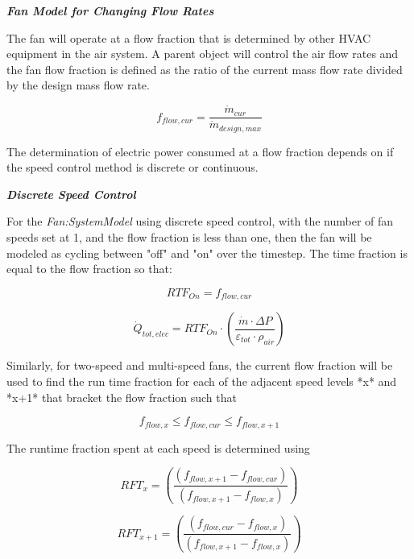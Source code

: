 \emph{\textbf{Fan Model for Changing Flow Rates}}

The fan will operate at a flow fraction that is determined by other HVAC equipment in the air system.  A parent object will control the air flow rates and the fan flow fraction is defined as the ratio of the current mass flow rate divided by the design mass flow rate.

\begin{equation}
{f_{flow, cur}} = \frac{\dot m_{cur}}{\dot m_{design,max}}
\end{equation}

The determination of electric power consumed at a flow fraction depends on if the speed control method is discrete or continuous.

\emph{\textbf{Discrete Speed Control}}

For the \emph{Fan:SystemModel} using discrete speed control, with the number of fan speeds set at 1, and the flow fraction is less than one, then the fan will be modeled as cycling between "off" and "on" over the timestep.  The time fraction is equal to the flow fraction so that:

\begin{equation}
{RTF_{On}} = {f_{flow, cur}}
\end{equation}

\begin{equation}
{\dot Q_{tot,elec}} = {RTF_{On}} \cdot \left( \frac{\dot m\cdot \Delta P}{{\varepsilon_{tot}}\cdot {\rho_{air}}}\right)
\end{equation}

Similarly, for two-speed and multi-speed fans, the current flow fraction will be used to find the run time fraction for each of the adjacent speed levels *x* and *x+1* that bracket the flow fraction such that

\begin{equation}
{f_{flow,x}} \leq {f_{flow, cur}} \leq {f_{flow,x+1}}
\end{equation}

The runtime fraction spent at each speed is determined using

\begin{equation}
{RFT_{x}} = \left( \frac{({f_{flow,x+1}} - {f_{flow, cur}} )}{({f_{flow,x+1}} - {f_{flow,x}})}  \right)
\end{equation}

\begin{equation}
{RFT_{x+1}} = \left( \frac{({f_{flow, cur}} - {f_{flow,x}} )}{({f_{flow,x+1}} - {f_{flow,x}})}  \right)
\end{equation}

